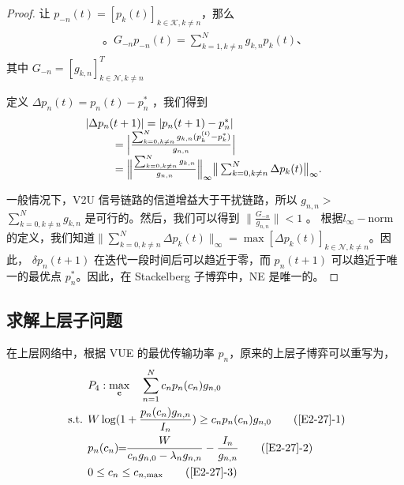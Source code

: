 \begin{proof}
让 $p_{-n}(t)=[p_k(t)]_{k\in\mathcal{K},k\neq n}$，那么
\begin{eqnarray}\label{25}
\begin{array}{lll}。
G_{-n}p_{-n}(t)=\sum\limits_{k=1,k\neq n}^N g_{k,n}p_k(t)、
\end{array}
\end{eqnarray}
其中 $G_{-n}=[g_{k,n}]_{k\in\mathcal{N},k\neq n}^T$ \par
定义 $\Delta p_{n}(t)=p_{n}(t)-p_{n}^*$ ，我们得到
\begin{eqnarray}\label{26}
\hspace{-0.2cm}
 \begin{array}{lll}
&\!\!\!\!|\Delta p_{n}(t+1)|=|p_{n}(t+1)-p_{n}^*|\\
&\quad \quad  =\Big|\frac{\sum_{k=0,k\neq n}^N g_{k,n}(p_k^{(t)}-p_k^*)}{g_{n,n}}\Big|\\
&\quad \quad  =\Big\|\frac{\sum_{k=0,k\neq n}^Ng_{k,n}}{g_{n,n}}\Big\|_\infty \big\|\sum_{k=0,k\neq n}^N\Delta p_{k}(t)\big\|_\infty.
\end{array}
\end{eqnarray}

一般情况下，V2U 信号链路的信道增益大于干扰链路，所以 $g_{n,n}$$>$$\sum_{k=0,k\neq n}^N g_{k,n}$ 是可行的。然后，我们可以得到 $\|\frac{G_{-n}}{g_{n,n}}\|$$<$$1$ 。
根据$l_\infty-$norm的定义，我们知道$\big\|\sum_{k=0,k\neq n}^N\Delta p_{k}(t)\big\|_\infty$$=$$\max [\Delta p_{k}(t)]_{k\in\mathcal{N},k\neq n}$。因此，
$\delta p_{n}(t+1)$ 在迭代一段时间后可以趋近于零，而 $p_{n}(t+1)$ 可以趋近于唯一的最优点 $p_{n}^*$。因此，在 Stackelberg 子博弈中，NE 是唯一的。
\end{proof}
\subsection{求解上层子问题}\label{section2-3-3}
在上层网络中，根据 VUE 的最优传输功率 $p_n$，原来的上层子博弈可以重写为，
\begin{align}
&P_4:\max\limits_{\mathbf{c}} \quad \sum\limits_{n=1}^N c_{n} p_n(c_{n}) g_{n,0}               \label{E2-27}\\
\text { s.t. }
& W\log(1+\frac{p_{n}(c_{n}) g_{n,n}}{I_n}) \geq c_{n} p_n(c_{n}) g_{n,0}          \tag{\ref{E2-27}{-1}}      \label{E2-27-1}\\  %
& p_n(c_{n})\!\!=\!\!\frac{W}{c_n g_{n,0}-\lambda_n g_{n,n}}-\frac{I_n}{g_{n,n}}   \tag{\ref{E2-27}{-2}}      \label{E2-27-2}\\ %
& 0\leq c_n\leq c_{n,\textrm{max}}                                                 \tag{\ref{E2-27}{-3}}      \label{E2-27-3}
\end{align}


